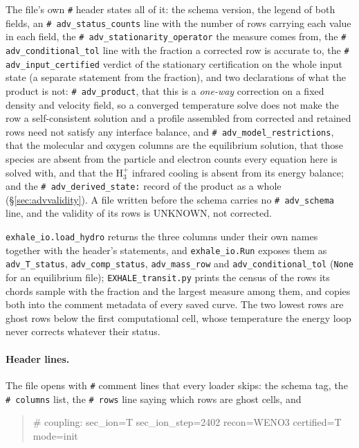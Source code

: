\documentclass[english,a4paper]{my_memo}
\begin{document}
The file's own \texttt{\#} header states all of it: the schema version, the legend of both
fields, an \texttt{\# adv\_status\_counts} line with the number of rows carrying each value
in each field, the \texttt{\# adv\_stationarity\_operator} the measure comes from, the
\texttt{\# adv\_conditional\_tol} line with the fraction a corrected row is accurate to,
the \texttt{\# adv\_input\_certified} verdict of the stationary certification on the whole
input state (a separate statement from the fraction), and two declarations of what the
product is not: \texttt{\# adv\_product}, that this is a \emph{one-way} correction on a
fixed density and velocity field, so a converged temperature solve does not make the row a
self-consistent solution and a profile assembled from corrected and retained rows need not
satisfy any interface balance, and \texttt{\# adv\_model\_restrictions}, that the molecular
and oxygen columns are the equilibrium solution, that those species are absent from the
particle and electron counts every equation here is solved with, and that the H$_3^+$
infrared cooling is absent from its energy balance; and the \texttt{\# adv\_derived\_state:}
record of the product as a whole (\S\ref{sec:advvalidity}). A file written before the schema
carries no \texttt{\# adv\_schema} line, and the validity of its rows is UNKNOWN, not
corrected.

\texttt{exhale\_io.load\_hydro} returns the three columns under their own names together
with the header's statements, and \texttt{exhale\_io.Run} exposes them as
\texttt{adv\_T\_status}, \texttt{adv\_comp\_status}, \texttt{adv\_mass\_row} and
\texttt{adv\_conditional\_tol} (\texttt{None} for an equilibrium file);
\texttt{EXHALE\_transit.py} prints the census of the rows its chords sample with the
fraction and the largest measure among them, and copies both into the comment metadata of
every saved curve. The two lowest rows are ghost rows below the first computational cell,
whose temperature the energy loop never corrects whatever their status.

\paragraph{Header lines.} The file opens with \texttt{\#} comment lines that
every loader skips: the schema tag, the \texttt{\# columns} list, the
\texttt{\# rows} line saying which rows are ghost cells, and

\begin{quote}\ttfamily\small
\# coupling: sec\_ion=T sec\_ion\_step=2402 recon=WENO3 certified=T mode=init
\end{quote}
\end{document}
